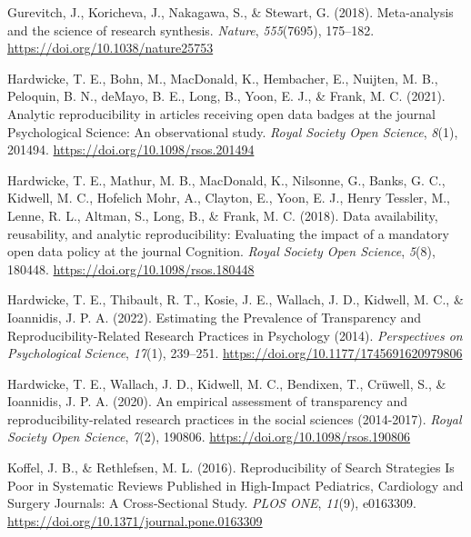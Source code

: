 \documentclass[
  ,man,floatsintext]{apa6}
\newlength{\cslhangindent}
\newlength{\cslentryspacingunit} %
\newenvironment{CSLReferences}[2] %
 {%
  \setlength{\parindent}{0pt}
  \ifodd #1
  \let\oldpar\par
  \def\par{\hangindent=\cslhangindent\oldpar}
  \fi
  \setlength{\parskip}{#2\cslentryspacingunit}
 }%
 {}
\begin{document}
\begin{CSLReferences}{1}{0}
\leavevmode{}%
Gurevitch, J., Koricheva, J., Nakagawa, S., \& Stewart, G. (2018). Meta-analysis and the science of research synthesis. \emph{Nature}, \emph{555}(7695), 175--182. \url{https://doi.org/10.1038/nature25753}

\leavevmode{}%
Hardwicke, T. E., Bohn, M., MacDonald, K., Hembacher, E., Nuijten, M. B., Peloquin, B. N., deMayo, B. E., Long, B., Yoon, E. J., \& Frank, M. C. (2021). Analytic reproducibility in articles receiving open data badges at the journal {Psychological Science}: An observational study. \emph{Royal Society Open Science}, \emph{8}(1), 201494. \url{https://doi.org/10.1098/rsos.201494}

\leavevmode{}%
Hardwicke, T. E., Mathur, M. B., MacDonald, K., Nilsonne, G., Banks, G. C., Kidwell, M. C., Hofelich Mohr, A., Clayton, E., Yoon, E. J., Henry Tessler, M., Lenne, R. L., Altman, S., Long, B., \& Frank, M. C. (2018). Data availability, reusability, and analytic reproducibility: Evaluating the impact of a mandatory open data policy at the journal {Cognition}. \emph{Royal Society Open Science}, \emph{5}(8), 180448. \url{https://doi.org/10.1098/rsos.180448}

\leavevmode{}%
Hardwicke, T. E., Thibault, R. T., Kosie, J. E., Wallach, J. D., Kidwell, M. C., \& Ioannidis, J. P. A. (2022). Estimating the {Prevalence} of {Transparency} and {Reproducibility-Related Research Practices} in {Psychology} (2014). \emph{Perspectives on Psychological Science}, \emph{17}(1), 239--251. \url{https://doi.org/10.1177/1745691620979806}

\leavevmode{}%
Hardwicke, T. E., Wallach, J. D., Kidwell, M. C., Bendixen, T., Crüwell, S., \& Ioannidis, J. P. A. (2020). An empirical assessment of transparency and reproducibility-related research practices in the social sciences (2014-2017). \emph{Royal Society Open Science}, \emph{7}(2), 190806. \url{https://doi.org/10.1098/rsos.190806}

\leavevmode{}%
Koffel, J. B., \& Rethlefsen, M. L. (2016). Reproducibility of {Search} {Strategies} {Is} {Poor} in {Systematic} {Reviews} {Published} in {High}-{Impact} {Pediatrics}, {Cardiology} and {Surgery} {Journals}: {A} {Cross}-{Sectional} {Study}. \emph{PLOS ONE}, \emph{11}(9), e0163309. \url{https://doi.org/10.1371/journal.pone.0163309}


\end{CSLReferences}
\end{document}
